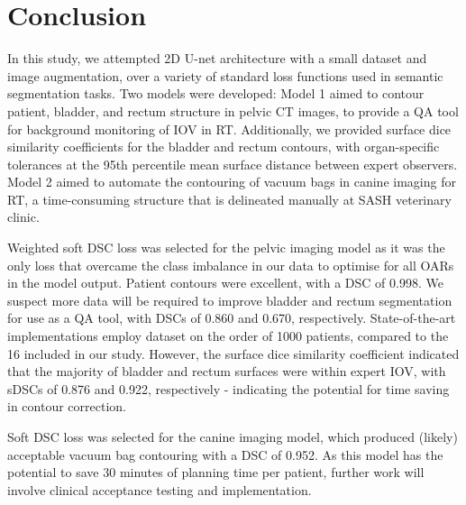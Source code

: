 \chapter{Conclusion}
\label{ch:conclusion}

In this study, we attempted 2D U-net architecture with a small dataset and image augmentation, over a variety of standard loss functions used in semantic segmentation tasks. Two models were developed: Model 1 aimed to contour patient, bladder, and rectum structure in pelvic CT images, to provide a QA tool for background monitoring of IOV in RT. Additionally, we provided surface dice similarity coefficients for the bladder and rectum contours, with organ-specific tolerances at the 95th percentile mean surface distance between expert observers. Model 2 aimed to automate the contouring of vacuum bags in canine imaging for RT, a time-consuming structure that is delineated manually at SASH veterinary clinic.

Weighted soft DSC loss was selected for the pelvic imaging model as it was the only loss that overcame the class imbalance in our data to optimise for all OARs in the model output. Patient contours were excellent,
with a DSC of 0.998. We suspect more data will be required to improve bladder and rectum segmentation for use as a QA tool, with DSCs of 0.860 and 0.670, respectively. State-of-the-art implementations employ dataset on the order of 1000 patients, compared to the 16 included in our study. However, the surface dice similarity coefficient indicated that the majority of bladder and rectum surfaces were within expert IOV, with sDSCs of 0.876 and 0.922, respectively - indicating the potential for time saving in contour correction.

Soft DSC loss was selected for the canine imaging model, which produced (likely)
acceptable vacuum bag contouring with a DSC of 0.952. As this model has the potential to save 30 minutes of planning time per patient, further work will involve clinical acceptance testing and implementation.


